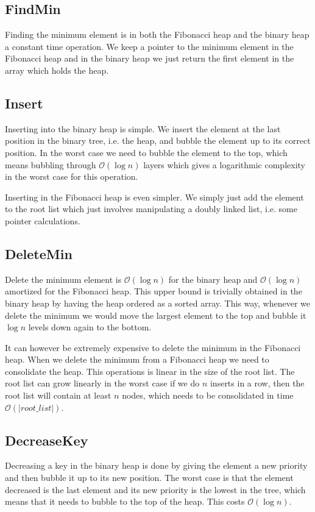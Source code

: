 \documentclass[a4paper,oneside,article,11pt]{memoir}
\begin{document}
\subsection{FindMin}
Finding the minimum element is in both the Fibonacci heap and the binary heap a constant time operation. We keep a pointer to the minimum element in the Fibonacci heap and in the binary heap we just return the first element in the array which holds the heap.

\subsection{Insert}
Inserting into the binary heap is simple. We insert the element at the last position in the binary tree, i.e. the heap, and bubble the element up to its correct position. In the worst case we need to bubble the element to the top, which means bubbling through $\mathcal{O}(\log n)$ layers which gives a logarithmic complexity in the worst case for this operation.

Inserting in the Fibonacci heap is even simpler. We simply just add the element to the root list which just involves manipulating a doubly linked list, i.e. some pointer calculations. 

\subsection{DeleteMin}
Delete the minimum element is $\mathcal{O}(\log{n})$ for the binary heap and $\mathcal{O}(\log{n})$ amortized for the Fibonacci heap. This upper bound is trivially obtained in the binary heap by having the heap ordered as a sorted array. This way, whenever we delete the minimum we would move the largest element to the top and bubble it $\log n$ levels down again to the bottom.

It can however be extremely expensive to delete the minimum in the Fibonacci heap. When we delete the minimum from a Fibonacci heap we need to consolidate the heap. This operations is linear in the size of the root list. The root list can grow linearly in the worst case if we do $n$ inserts in a row, then the root list will contain at least $n$ nodes, which needs to be consolidated in time $\mathcal{O}(\vert root\_list \vert)$.

\subsection{DecreaseKey}
Decreasing a key in the binary heap is done by giving the element a new priority and then bubble it up to its new position. The worst case is that the element decreased is the last element and its new priority is the lowest in the tree, which means that it needs to bubble to the top of the heap. This costs $\mathcal{O}(\log n)$.
\end{document}
